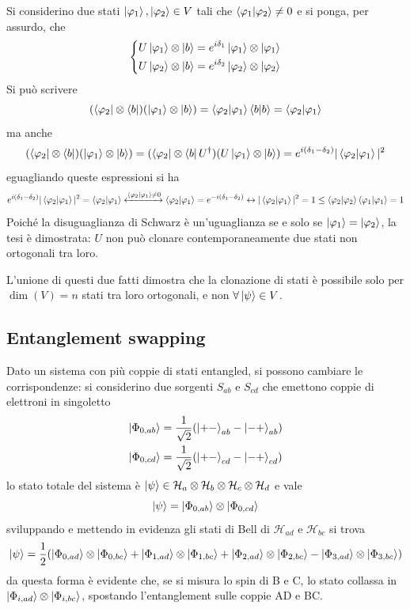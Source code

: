 Si considerino due stati $\ket{\varphi_1},\ket{\varphi_2}\in V$ tali che
$\bra{\varphi_1}\ket{\varphi_2}\not=0$ e si ponga, per assurdo, che
$$\begin{dcases*}
      U\ket{\varphi_1}\otimes\ket{b}=e^{i\delta_1}\ket{\varphi_1}\otimes\ket{\varphi_1}\\
      U\ket{\varphi_2}\otimes\ket{b}=e^{i\delta_2}\ket{\varphi_2}\otimes\ket{\varphi_2}
\end{dcases*}$$
Si può scrivere
$$(\bra{\varphi_2}\otimes\bra{b})(\ket{\varphi_1}\otimes\ket{b})=
\bra{\varphi_2}\ket{\varphi_1}\bra{b}\ket{b}=\bra{\varphi_2}\ket{\varphi_1}
$$
ma anche
$$(\bra{\varphi_2}\otimes\bra{b})(\ket{\varphi_1}\otimes\ket{b})=
(\bra{\varphi_2}\otimes\bra{b}U^\dagger)(U\ket{\varphi_1}\otimes\ket{b})=
e^{i(\delta_1-\delta_2)}|\bra{\varphi_2}\ket{\varphi_1}|^2
$$
eguagliando queste espressioni si ha
$$e^{i(\delta_1-\delta_2)}|\bra{\varphi_2}\ket{\varphi_1}|^2=\bra{\varphi_2}\ket{\varphi_1}
\xleftrightarrow{\bra{\varphi_2}\ket{\varphi_1}\not=0}\bra{\varphi_2}\ket{\varphi_1}=
e^{-i(\delta_1-\delta_2)}\leftrightarrow|\bra{\varphi_2}\ket{\varphi_1}|^2=1\leq
\bra{\varphi_2}\ket{\varphi_2}\bra{\varphi_1}\ket{\varphi_1}=1
$$
Poiché la disuguaglianza di Schwarz è un'uguaglianza se e solo se $\ket{\varphi_1}=\ket{\varphi_2}$,
la tesi è dimostrata: $U$ non può clonare contemporaneamente due stati non ortogonali tra loro.

L'unione di questi due fatti dimostra che la clonazione di stati è possibile solo per $\dim(V)=n$
stati tra loro ortogonali, e non $\forall\ket{\psi}\in V$.

\subsection{Entanglement swapping}
Dato un sistema con più coppie di stati entangled, si possono cambiare le corrispondenze:
si considerino due sorgenti $S_{ab}$ e $S_{cd}$ che emettono coppie di elettroni in singoletto
\begin{gather*}
    \ket{\Phi_{0,ab}}=\frac{1}{\sqrt{2}}(\ket{+-}_{ab}-\ket{-+}_{ab})\\
    \ket{\Phi_{0,cd}}=\frac{1}{\sqrt{2}}(\ket{+-}_{cd}-\ket{-+}_{cd})
\end{gather*}
lo stato totale del sistema è $\ket{\psi}\in\mathcal{H}_{a}\otimes\mathcal{H}_b\otimes\mathcal{H}_c
\otimes\mathcal{H}_d$ e vale
$$\ket{\psi}=\ket{\Phi_{0,ab}}\otimes\ket{\Phi_{0,cd}}$$
sviluppando e mettendo in evidenza gli stati di Bell di $\mathcal{H}_{ad}$ e $\mathcal{H}_{bc}$ si
trova
$$\ket{\psi}=\frac{1}{2}(\ket{\Phi_{0,ad}}\otimes\ket{\Phi_{0,bc}}+
\ket{\Phi_{1,ad}}\otimes\ket{\Phi_{1,bc}}+\ket{\Phi_{2,ad}}\otimes\ket{\Phi_{2,bc}}-
\ket{\Phi_{3,ad}}\otimes\ket{\Phi_{3,bc}})$$	
da questa forma è evidente che, se si misura lo spin di B e C, lo stato collassa in
$\ket{\Phi_{i,ad}}\otimes\ket{\Phi_{i,bc}}$, spostando l'entanglement sulle coppie AD e BC.
